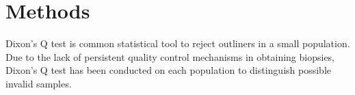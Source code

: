 \chapter{Methods}

Dixon's Q test is common statistical tool to reject outliners in a small population. Due to the lack of persistent quality control mechanisms in obtaining biopsies, Dixon's Q test has been conducted on each population to distinguish possible invalid samples. 